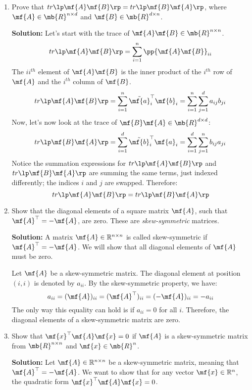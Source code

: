 \begin{enumerate}
    \item Prove that $tr\lp \mf{A}\mf{B} \rp = tr\lp \mf{B}\mf{A} \rp$, where $\mf{A} \in \mb{R}^{n \times d}$ and $\mf{B} \in \mb{R}^{d \times n}$.
    \begin{boxedstuff}
        \vspace{4mm}
        \textbf{Solution:} Let's start with the trace of $\mf{A}\mf{B} \in \mb{R}^{n \times n}$.
        \[
        tr\lp \mf{A}\mf{B} \rp = \sum_{i=1}^n \pp{\mf{A}\mf{B}}_{ii}
        \]
        The ${ii}^{th}$ element of $\mf{A}\mf{B}$ is the inner product of the $i^{th}$ row of $\mf{A}$ and the $i^{th}$ column of $\mf{B}$.
        \[
            tr\lp \mf{A}\mf{B} \rp = \sum_{i=1}^n \tilde{\mf{a}}_i^\top\mf{b}_i = \sum_{i=1}^n \sum_{j=1}^d a_{ij}b_{ji}
        \]
        Now, let's now look at the trace of $\mf{B}\mf{A} \in \mb{R}^{d \times d}$:
        \[
        tr\lp \mf{B}\mf{A} \rp = \sum_{i=1}^d \tilde{\mf{b}}_i^\top\mf{a}_i = \sum_{i=1}^d \sum_{j=1}^n b_{ij}a_{ji}
        \]
        Notice the summation expressions for $tr\lp \mf{A}\mf{B} \rp$ and $tr\lp \mf{B}\mf{A} \rp$ are summing the same terms, just indexed differently; the indices $i$ and $j$ are swapped. Therefore:
        \[
        tr\lp \mf{A}\mf{B} \rp = tr\lp \mf{B}\mf{A} \rp
        \]
    \end{boxedstuff}

    \item Show that the diagonal elements of a square matrix $\mf{A}$, such that $\mf{A}^\top = -\mf{A}$, are zero. These are \textit{skew-symmetric} matrices.

    \begin{boxedstuff}
        \vspace{4mm}
        \textbf{Solution:} A matrix $\mf{A} \in \mathbb{R}^{n \times n}$ is called skew-symmetric if $\mf{A}^\top = -\mf{A}$. We will show that all diagonal elements of $\mf{A}$ must be zero.

        Let $\mf{A}$ be a skew-symmetric matrix. The diagonal element at position $(i,i)$ is denoted by $a_{ii}$. By the skew-symmetric property, we have:
        \[
        a_{ii} = (\mf{A})_{ii} = (\mf{A}^\top)_{ii} = (-\mf{A})_{ii} = -a_{ii}
        \]
        The only way this equality can hold is if $a_{ii} = 0$ for all $i$. Therefore, the diagonal elements of a skew-symmetric matrix are zero.
    \end{boxedstuff}

    \item Show that $\mf{x}^\top\mf{A}\mf{x} = 0$ if $\mf{A}$ is a skew-symmetric matrix from $\mb{R}^{n \times n}$ and $\mf{x} \in \mb{R}^n$.
    \begin{boxedstuff}
        \vspace{4mm}
        \textbf{Solution:} Let $\mf{A} \in \mathbb{R}^{n \times n}$ be a skew-symmetric matrix, meaning that $\mf{A}^\top = -\mf{A}$. We want to show that for any vector $\mf{x} \in \mathbb{R}^n$, the quadratic form $\mf{x}^\top \mf{A} \mf{x} = 0$.


\end{boxedstuff}
\end{enumerate}
